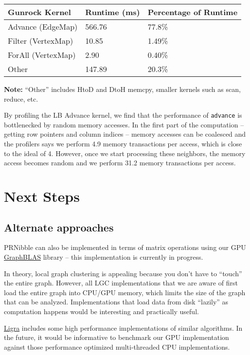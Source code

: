 \documentclass[10pt,oneside]{memoir}
\begin{document}
\begin{longtable}[]{@{}lll@{}}
\toprule
Gunrock Kernel & Runtime (ms) & Percentage of Runtime\tabularnewline
\midrule
\endhead
Advance (EdgeMap) & 566.76 & 77.8\%\tabularnewline
Filter (VertexMap) & 10.85 & 1.49\%\tabularnewline
ForAll (VertexMap) & 2.90 & 0.40\%\tabularnewline
Other & 147.89 & 20.3\%\tabularnewline
\bottomrule
\end{longtable}

\textbf{Note:} ``Other'' includes HtoD and DtoH memcpy, smaller kernels
such as scan, reduce, etc.

By profiling the LB Advance kernel, we find that the performance of
\texttt{advance} is bottlenecked by random memory accesses. In the first
part of the computation -- getting row pointers and column indices --
memory accesses can be coalesced and the profilers says we perform 4.9
memory transactions per access, which is close to the ideal of 4.
However, once we start processing these neighbors, the memory access
becomes random and we perform 31.2 memory transactions per access.

\hypertarget{next-steps-5}{%
\section{Next Steps}\label{next-steps-5}}

\hypertarget{alternate-approaches-4}{%
\subsection{Alternate approaches}\label{alternate-approaches-4}}

PRNibble can also be implemented in terms of matrix operations using our
GPU \href{https://github.com/owensgroup/GraphBLAS/}{GraphBLAS} library
-- this implementation is currently in progress.

In theory, local graph clustering is appealing because you don't have to
``touch'' the entire graph. However, all LGC implementations that we are
aware of first load the entire graph into CPU/GPU memory, which limits
the size of the graph that can be analyzed. Implementations that load
data from disk ``lazily'' as computation happens would be interesting
and practically useful.

\href{https://github.com/jshun/ligra}{Ligra} includes some high
performance implementations of similar algorithms. In the future, it
would be informative to benchmark our GPU implementation against those
performance optimized multi-threaded CPU implementations.
\end{document}
